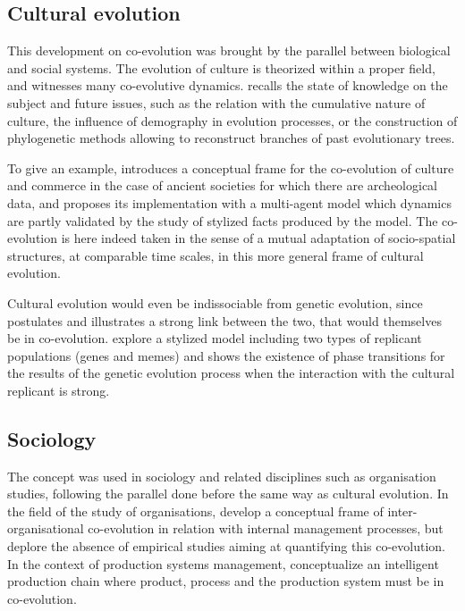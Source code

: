 \documentclass[letterpaper]{article}
\begin{document}
\subsection{Cultural evolution}

This development on co-evolution was brought by the parallel between biological and social systems. The evolution of culture is theorized within a proper field, and witnesses many co-evolutive dynamics. \cite{Mesoudi25072017} recalls the state of knowledge on the subject and future issues, such as the relation with the cumulative nature of culture, the influence of demography in evolution processes, or the construction of phylogenetic methods allowing to reconstruct branches of past evolutionary trees.

To give an example, \cite{carrignon2015modelling} introduces a conceptual frame for the co-evolution of culture and commerce in the case of ancient societies for which there are archeological data, and proposes its implementation with a multi-agent model which dynamics are partly validated by the study of stylized facts produced by the model. The co-evolution is here indeed taken in the sense of a mutual adaptation of socio-spatial structures, at comparable time scales, in this more general frame of cultural evolution.


Cultural evolution would even be indissociable from genetic evolution, since \cite{durham1991coevolution} postulates and illustrates a strong link between the two, that would themselves be in co-evolution. \cite{bull2000meme} explore a stylized model including two types of replicant populations (genes and memes) and shows the existence of phase transitions for the results of the genetic evolution process when the interaction with the cultural replicant is strong.


\subsection{Sociology}

The concept was used in sociology and related disciplines such as organisation studies, following the parallel done before the same way as cultural evolution. In the field of the study of organisations, \cite{volberda2003co} develop a conceptual frame of inter-organisational co-evolution in relation with internal management processes, but deplore the absence of empirical studies aiming at quantifying this co-evolution. In the context of production systems management, \cite{tolio2010species} conceptualize an intelligent production chain where product, process and the production system must be in co-evolution.
\end{document}
